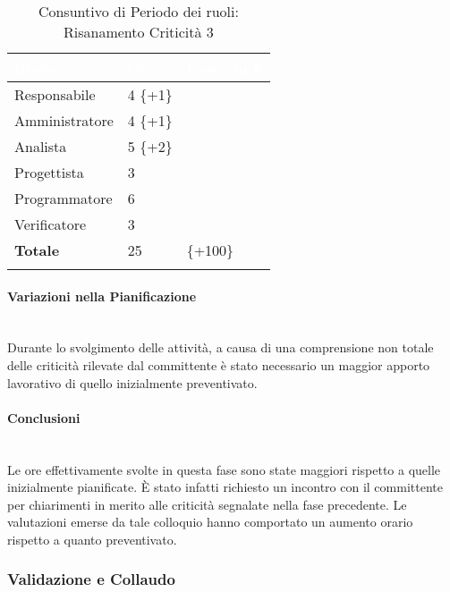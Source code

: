 \begin{longtable}{| C{.30\textwidth}| C{.15\textwidth}| C{.20\textwidth}|}
	\hline
	\textbf{\textcolor{white}{Ruolo}} & \textbf{\textcolor{white}{Ore}} & \textbf{\textcolor{white}{Costo 	in \euro}} \\
	\hline 
	Responsabile & 4 \{+1\}&  \\
	\hline
	Amministratore & 4 \{+1\} &  \\
	\hline
	Analista & 5 \{+2\}&  \\
	\hline
	Progettista & 3 & \\
	\hline
	Programmatore & 6&  \\
	\hline 
	Verificatore & 3 &  \\
	\hline
	\textbf{Totale} & 25 &  \{+100\} \\
	\hline 
	
	\caption{Consuntivo di Periodo dei ruoli: Risanamento Criticità 3}
	\label{Distribuzione ruoli RC3}
\end{longtable}

\paragraph{Variazioni nella Pianificazione} ~\\ 
Durante lo svolgimento delle attività, a causa di una comprensione non totale delle criticità rilevate dal committente è stato necessario un maggior apporto lavorativo di quello inizialmente preventivato.

\paragraph{Conclusioni} ~\\ Le ore effettivamente svolte in questa fase sono state maggiori rispetto a quelle inizialmente pianificate. È stato infatti richiesto un incontro con il committente per chiarimenti in merito alle criticità segnalate nella fase precedente. Le valutazioni emerse da tale colloquio hanno comportato un aumento orario rispetto a quanto preventivato.

\pagebreak


\subsubsection{Validazione e Collaudo}
\label{PRC}
